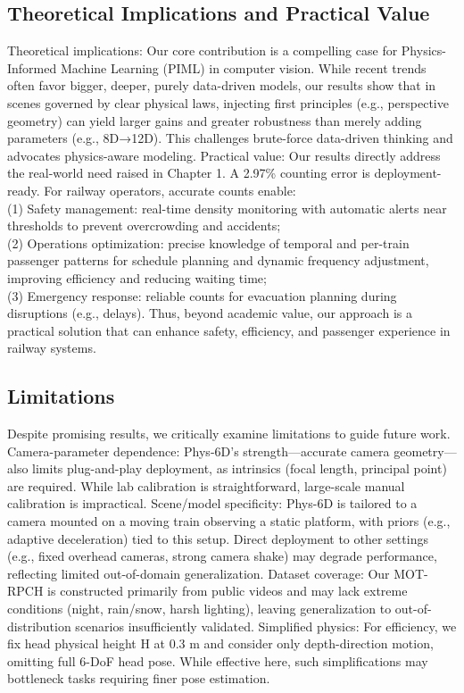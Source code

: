 \subsection{Theoretical Implications and Practical Value}

Theoretical implications: Our core contribution is a compelling case for Physics-Informed Machine Learning (PIML) in computer vision. While recent trends often favor bigger, deeper, purely data-driven models, our results show that in scenes governed by clear physical laws, injecting first principles (e.g., perspective geometry) can yield larger gains and greater robustness than merely adding parameters (e.g., 8D→12D). This challenges brute-force data-driven thinking and advocates physics-aware modeling.
Practical value: Our results directly address the real-world need raised in Chapter 1. A 2.97\% counting error is deployment-ready. For railway operators, accurate counts enable: \\(1) Safety management: real-time density monitoring with automatic alerts near thresholds to prevent overcrowding and accidents; \\(2) Operations optimization: precise knowledge of temporal and per-train passenger patterns for schedule planning and dynamic frequency adjustment, improving efficiency and reducing waiting time; \\(3) Emergency response: reliable counts for evacuation planning during disruptions (e.g., delays). Thus, beyond academic value, our approach is a practical solution that can enhance safety, efficiency, and passenger experience in railway systems.

\subsection{Limitations}

Despite promising results, we critically examine limitations to guide future work. Camera-parameter dependence: Phys-6D’s strength—accurate camera geometry—also limits plug-and-play deployment, as intrinsics (focal length, principal point) are required. While lab calibration is straightforward, large-scale manual calibration is impractical.
Scene/model specificity: Phys-6D is tailored to a camera mounted on a moving train observing a static platform, with priors (e.g., adaptive deceleration) tied to this setup. Direct deployment to other settings (e.g., fixed overhead cameras, strong camera shake) may degrade performance, reflecting limited out-of-domain generalization.
Dataset coverage: Our MOT-RPCH is constructed primarily from public videos and may lack extreme conditions (night, rain/snow, harsh lighting), leaving generalization to out-of-distribution scenarios insufficiently validated.
Simplified physics: For efficiency, we fix head physical height H at 0.3 m and consider only depth-direction motion, omitting full 6-DoF head pose. While effective here, such simplifications may bottleneck tasks requiring finer pose estimation.

